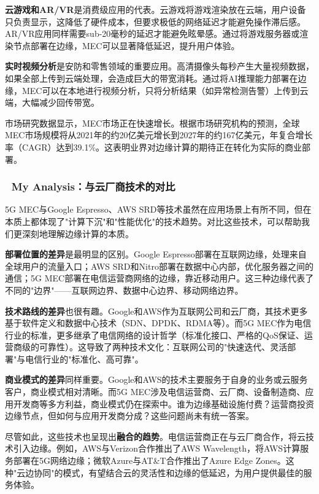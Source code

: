 \textbf{云游戏和AR/VR}是消费级应用的代表。云游戏将游戏渲染放在云端，用户设备只负责显示，这降低了硬件成本，但要求极低的网络延迟才能避免操作滞后感。AR/VR应用同样需要sub-20毫秒的延迟才能避免眩晕感。通过将游戏服务器或渲染节点部署在边缘，MEC可以显著降低延迟，提升用户体验。

\textbf{实时视频分析}是安防和零售领域的重要应用。高清摄像头每秒产生大量视频数据，如果全部上传到云端处理，会造成巨大的带宽消耗。通过将AI推理能力部署在边缘，MEC可以在本地进行视频分析，只将分析结果（如异常检测告警）上传到云端，大幅减少回传带宽。

市场研究数据显示，MEC市场正在快速增长。根据市场研究机构的预测，全球MEC市场规模将从2021年的约20亿美元增长到2027年的约167亿美元，年复合增长率（CAGR）达到39.1\%。这表明业界对边缘计算的期待正在转化为实际的商业部署。

\subsubsection{🧠 My Analysis：与云厂商技术的对比}

5G MEC与Google Espresso、AWS SRD等技术虽然在应用场景上有所不同，但在本质上都体现了"计算下沉"和"性能优化"的技术趋势。对比这些技术，可以帮助我们更深刻地理解边缘计算的本质。

\textbf{部署位置的差异}是最明显的区别。Google Espresso部署在互联网边缘，处理来自全球用户的流量入口；AWS SRD和Nitro部署在数据中心内部，优化服务器之间的通信；5G MEC部署在电信运营商网络的边缘，靠近移动用户。这三种边缘代表了不同的"边界"——互联网边界、数据中心边界、移动网络边界。

\textbf{技术路线的差异}也很有趣。Google和AWS作为互联网公司和云厂商，其技术更多基于软件定义和数据中心技术（SDN、DPDK、RDMA等）。而5G MEC作为电信行业的标准，更多继承了电信网络的设计哲学（标准化接口、严格的QoS保证、运营商级的可靠性）。这导致了两种技术文化：互联网公司的"快速迭代、灵活部署"与电信行业的"标准化、高可靠"。

\textbf{商业模式的差异}同样重要。Google和AWS的技术主要服务于自身的业务或云服务客户，商业模式相对清晰。而5G MEC涉及电信运营商、云厂商、设备制造商、应用开发商等多方利益，商业模式仍在探索中。谁为边缘基础设施付费？运营商投资边缘节点，但如何与应用开发商分成？这些问题尚未有统一答案。

尽管如此，这些技术也呈现出\textbf{融合的趋势}。电信运营商正在与云厂商合作，将云技术引入边缘。例如，AWS与Verizon合作推出了AWS Wavelength，将AWS计算服务部署在5G网络边缘；微软Azure与AT\&T合作推出了Azure Edge Zones。这种"云边协同"的模式，有望结合云的灵活性和边缘的低延迟，为用户提供最佳的服务体验。

